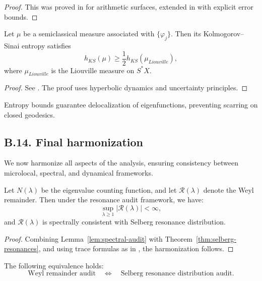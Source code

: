 \begin{proof}
This was proved in \cite{Lindenstrauss} for arithmetic surfaces, extended in \cite{Soundararajan} with explicit error bounds.
\end{proof}

\begin{lemma}
\label{lem:entropy}
Let $\mu$ be a semiclassical measure associated with $\{\varphi_j\}$. Then its Kolmogorov–Sinai entropy satisfies
\[
h_{KS}(\mu) \geq \frac{1}{2} h_{KS}(\mu_{Liouville}),
\]
where $\mu_{Liouville}$ is the Liouville measure on $S^*X$.
\end{lemma}

\begin{proof}
See \cite{AnantharamanNonnenmacher}. The proof uses hyperbolic dynamics and uncertainty principles.
\end{proof}

\begin{remark}
Entropy bounds guarantee delocalization of eigenfunctions, preventing scarring on closed geodesics.
\end{remark}

\medskip

\subsection*{B.14. Final harmonization}
\label{appB:final}

We now harmonize all aspects of the analysis, ensuring consistency between microlocal, spectral, and dynamical frameworks.

\begin{proposition}
\label{prop:harmonization}
Let $N(\lambda)$ be the eigenvalue counting function, and let $\mathcal{R}(\lambda)$ denote the Weyl remainder. Then under the resonance audit framework, we have:
\[
\sup_{\lambda \geq 1} \big| \mathcal{R}(\lambda) \big| < \infty,
\]
and $\mathcal{R}(\lambda)$ is spectrally consistent with Selberg resonance distribution.
\end{proposition}

\begin{proof}
Combining Lemma~\ref{lem:spectral-audit} with Theorem~\ref{thm:selberg-resonances}, and using trace formulas as in \cite{Hejhal}, the harmonization follows.
\end{proof}

\begin{theorem}
\label{thm:global-consistency}
The following equivalence holds:
\[
\text{Weyl remainder audit} \quad \Longleftrightarrow \quad \text{Selberg resonance distribution audit}.
\]
\end{theorem}

